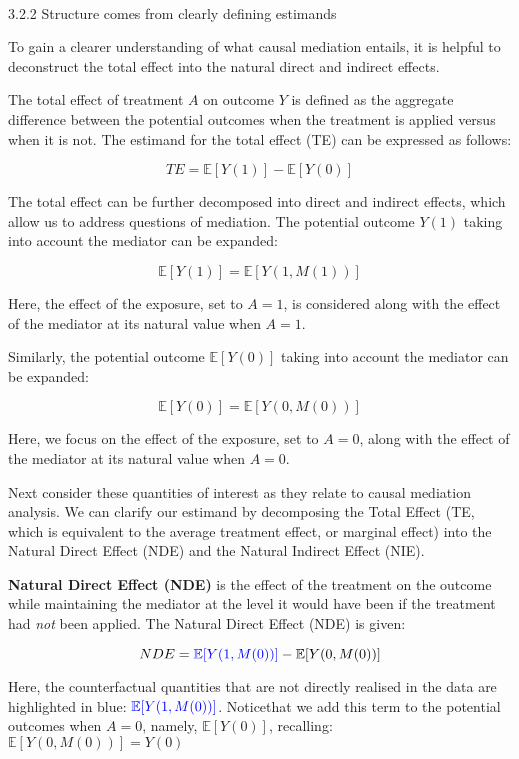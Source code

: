 \documentclass[
  singlecolumn]{article}
\makeatletter
\let\oldparagraph\paragraph
\renewcommand{\paragraph}{
    \@ifstar
      \xxxParagraphStar
      \xxxParagraphNoStar
  }
\newcommand{\xxxParagraphStar}[1]{\oldparagraph*{#1}\mbox{}}
\newcommand{\xxxParagraphNoStar}[1]{\oldparagraph{#1}\mbox{}}
\makeatother
\begin{document}
\paragraph{3.2.2 Structure comes from clearly defining
estimands}\label{structure-comes-from-clearly-defining-estimands}

To gain a clearer understanding of what causal mediation entails, it is
helpful to deconstruct the total effect into the natural direct and
indirect effects.

The total effect of treatment \(A\) on outcome \(Y\) is defined as the
aggregate difference between the potential outcomes when the treatment
is applied versus when it is not. The estimand for the total effect (TE)
can be expressed as follows:

\[
TE = \mathbb{E}[Y(1)] - \mathbb{E}[Y(0)]
\]

The total effect can be further decomposed into direct and indirect
effects, which allow us to address questions of mediation. The potential
outcome \(Y(1)\) taking into account the mediator can be expanded:

\[ 
\mathbb{E}[Y(1)] = \mathbb{E}[Y(1, M(1))]
\]

Here, the effect of the exposure, set to \(A = 1\), is considered along
with the effect of the mediator at its natural value when \(A = 1\).

Similarly, the potential outcome \(\mathbb{E}[Y(0)]\) taking into
account the mediator can be expanded:

\[ 
\mathbb{E}[Y(0)] = \mathbb{E}[Y(0, M(0))]
\]

Here, we focus on the effect of the exposure, set to \(A = 0\), along
with the effect of the mediator at its natural value when \(A = 0\).

Next consider these quantities of interest as they relate to causal
mediation analysis. We can clarify our estimand by decomposing the Total
Effect (TE, which is equivalent to the average treatment effect, or
marginal effect) into the Natural Direct Effect (NDE) and the Natural
Indirect Effect (NIE).

\textbf{Natural Direct Effect (NDE)} is the effect of the treatment on
the outcome while maintaining the mediator at the level it would have
been if the treatment had \emph{not} been applied. The Natural Direct
Effect (NDE) is given:

\[
 NDE = \textcolor{blue}{\mathbb{E}[Y(1, M(0))]} - \mathbb{E}[Y(0, M(0))]
 \]

Here, the counterfactual quantities that are not directly realised in
the data are highlighted in blue:
\(\textcolor{blue}{\mathbb{E}[Y(1, M(0))]}\). Noticethat we add this
term to the potential outcomes when \(A=0\), namely,
\(\mathbb{E}[Y(0)]\), recalling: \(\mathbb{E}[Y(0, M(0))] = Y(0)\)
\end{document}
